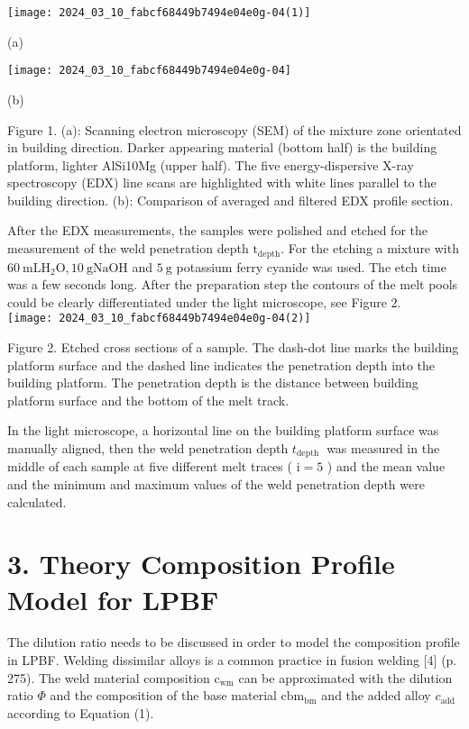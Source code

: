 \documentclass[10pt]{article}
\begin{document}
\begin{center}
\texttt{[image: 2024\_03\_10\_fabcf68449b7494e04e0g-04(1)]}
\end{center}

(a)

\begin{center}
\texttt{[image: 2024\_03\_10\_fabcf68449b7494e04e0g-04]}
\end{center}

(b)

Figure 1. (a): Scanning electron microscopy (SEM) of the mixture zone orientated in building direction. Darker appearing material (bottom half) is the building platform, lighter AlSi10Mg (upper half). The five energy-dispersive X-ray spectroscopy (EDX) line scans are highlighted with white lines parallel to the building direction. (b): Comparison of averaged and filtered EDX profile section.

After the EDX measurements, the samples were polished and etched for the measurement of the weld penetration depth $\mathrm{t}_{\mathrm{depth}}$. For the etching a mixture with $60 \mathrm{~mL} \mathrm{H}_{2} \mathrm{O}, 10 \mathrm{~g} \mathrm{NaOH}$ and $5 \mathrm{~g}$ potassium ferry cyanide was used. The etch time was a few seconds long. After the preparation step the contours of the melt pools could be clearly differentiated under the light microscope, see Figure 2.\\
\texttt{[image: 2024\_03\_10\_fabcf68449b7494e04e0g-04(2)]}

Figure 2. Etched cross sections of a sample. The dash-dot line marks the building platform surface and the dashed line indicates the penetration depth into the building platform. The penetration depth is the distance between building platform surface and the bottom of the melt track.

In the light microscope, a horizontal line on the building platform surface was manually aligned, then the weld penetration depth $t_{\text {depth }}$ was measured in the middle of each sample at five different melt traces ( $\mathrm{i}=5$ ) and the mean value and the minimum and maximum values of the weld penetration depth were calculated.

\section*{3. Theory Composition Profile Model for LPBF}
The dilution ratio needs to be discussed in order to model the composition profile in LPBF. Welding dissimilar alloys is a common practice in fusion welding [4] (p. 275). The weld material composition $\mathrm{c}_{\mathrm{wm}}$ can be approximated with the dilution ratio $\Phi$ and the composition of the base material $\mathrm{cbm}_{\mathrm{bm}}$ and the added alloy $c_{\text {add }}$ according to Equation (1).
\end{document}
